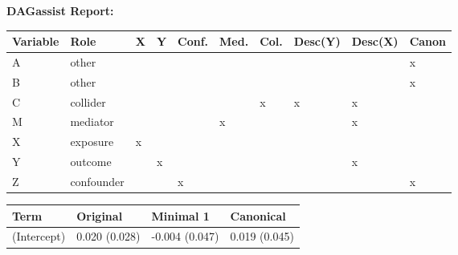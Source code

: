 \begingroup\footnotesize
\setlength{\LTleft}{0pt}\setlength{\LTright}{0pt}
\setlength{\tabcolsep}{4pt}
\renewcommand{\arraystretch}{0.95}
\setlength{\aboverulesep}{0pt}\setlength{\belowrulesep}{0pt}
\setlength{\LTpre}{0pt}\setlength{\LTpost}{0pt}
\begin{center}\textbf{DAGassist Report:}\end{center}
\begin{center}
\newlength{\DAWroles}\setlength{\DAWroles}{\dimexpr\textwidth - 18\tabcolsep\relax}
\begin{longtable}{@{}p{0.29\DAWroles}p{0.18\DAWroles}p{0.067\DAWroles}p{0.067\DAWroles}p{0.067\DAWroles}p{0.067\DAWroles}p{0.067\DAWroles}p{0.067\DAWroles}p{0.067\DAWroles}p{0.067\DAWroles}@{}}
\toprule
Variable & Role & {\centering X\par} & {\centering Y\par} & {\centering Conf.\par} & {\centering Med.\par} & {\centering Col.\par} & {\centering Desc(Y)\par} & {\centering Desc(X)\par} & {\centering Canon\par} \\
\midrule
A & other &  &  &  &  &  &  &  & x \\
B & other &  &  &  &  &  &  &  & x \\
C & collider &  &  &  &  & x & x & x &  \\
M & mediator &  &  &  & x &  &  & x &  \\
X & exposure & x &  &  &  &  &  &  &  \\
Y & outcome &  & x &  &  &  &  & x &  \\
Z & confounder &  &  & x &  &  &  &  & x \\
\bottomrule
\end{longtable}
\vspace{1pt}
\begingroup\renewcommand{\arraystretch}{1.08}
\begin{longtable}{@{}p{\dimexpr(\textwidth - 6\tabcolsep)/4\relax}p{\dimexpr(\textwidth - 6\tabcolsep)/4\relax}p{\dimexpr(\textwidth - 6\tabcolsep)/4\relax}p{\dimexpr(\textwidth - 6\tabcolsep)/4\relax}@{}}
\toprule
Term & Original & Minimal 1 & Canonical \\
\midrule
\textnormal{(Intercept)} & 0.020 (0.028) & -0.004 (0.047) & 0.019 (0.045) \\

\end{longtable}
\end{center}

